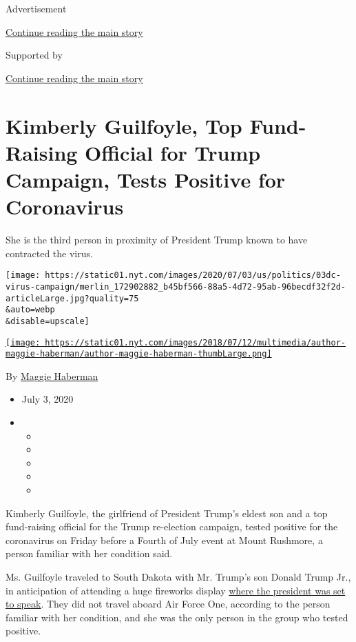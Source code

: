 Advertisement

\protect\hyperlink{after-top}{Continue reading the main story}

Supported by

\protect\hyperlink{after-sponsor}{Continue reading the main story}

\hypertarget{kimberly-guilfoyle-top-fund-raising-official-for-trump-campaign-tests-positive-for-coronavirus}{%
\section{Kimberly Guilfoyle, Top Fund-Raising Official for Trump
Campaign, Tests Positive for
Coronavirus}\label{kimberly-guilfoyle-top-fund-raising-official-for-trump-campaign-tests-positive-for-coronavirus}}

She is the third person in proximity of President Trump known to have
contracted the virus.

\texttt{[image: https://static01.nyt.com/images/2020/07/03/us/politics/03dc-virus-campaign/merlin\_172902882\_b45bf566-88a5-4d72-95ab-96becdf32f2d-articleLarge.jpg?quality=75\\\&auto=webp\\\&disable=upscale]}

\href{https://www.nytimes.com/by/maggie-haberman}{\texttt{[image: https://static01.nyt.com/images/2018/07/12/multimedia/author-maggie-haberman/author-maggie-haberman-thumbLarge.png]}}

By \href{https://www.nytimes.com/by/maggie-haberman}{Maggie Haberman}

\begin{itemize}
\item
  July 3, 2020
\item
  \begin{itemize}
  \item
  \item
  \item
  \item
  \item
  \end{itemize}
\end{itemize}

Kimberly Guilfoyle, the girlfriend of President Trump's eldest son and a
top fund-raising official for the Trump re-election campaign, tested
positive for the coronavirus on Friday before a Fourth of July event at
Mount Rushmore, a person familiar with her condition said.

Ms. Guilfoyle traveled to South Dakota with Mr. Trump's son Donald Trump
Jr., in anticipation of attending a huge fireworks display
\href{https://www.nytimes.com/2020/07/03/us/politics/trump-coronavirus-mount-rushmore.html}{where
the president was set to speak}. They did not travel aboard Air Force
One, according to the person familiar with her condition, and she was
the only person in the group who tested positive.

